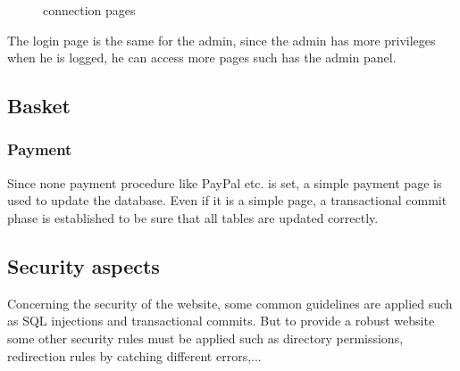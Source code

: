 \documentclass{article}
\begin{document}
\begin{figure}[h!]
    \caption{connection pages}%
    \label{fig:mineral}%
\end{figure}

The login page is the same for the admin, since the admin has more privileges when he is logged, he can access more pages such has the admin panel.

\subsection{Basket}

\subsubsection{Payment}
Since none payment procedure like PayPal etc. is set, a simple payment page is used to update the database. Even if it is a simple page, a transactional commit phase is established to be sure that all tables are updated correctly.

\subsection{Security aspects}
Concerning the security of the website, some common guidelines are applied such as SQL injections and transactional commits. But to provide a robust website some other security rules must be applied such as directory permissions, redirection rules by catching different errors,...
\end{document}
